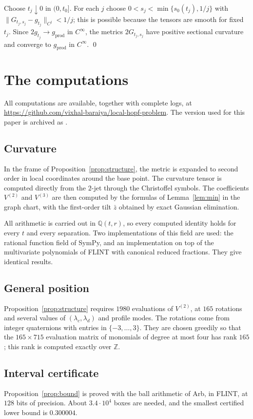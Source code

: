 \documentclass[11pt]{amsart}
\theoremstyle{definition}
\theoremstyle{remark}
\newcommand{\Q}{\mathbb{Q}}
\newcommand{\gprod}{g_{\mathrm{prod}}}
\newcommand{\codeurl}{\url{https://github.com/vixhal-baraiya/local-hopf-problem}}
\begin{document}
Choose $t_j\downarrow0$ in $(0,t_0]$. For each $j$ choose $0<s_j<\min\{s_0(t_j),1/j\}$ with $\|G_{t_j,s_j}-g_{t_j}\|_{C^j}<1/j$; this is possible because the tensors are smooth for fixed $t_j$. Since $2g_{t_j}\to\gprod$ in $C^\infty$, the metrics $2G_{t_j,s_j}$ have positive sectional curvature and converge to $\gprod$ in $C^\infty$. \qed

\section{The computations}\label{sec:computer}

All computations are available, together with complete logs, at\\ \codeurl. The version used for this paper is archived as \cite{code}.

\subsection*{Curvature}
In the frame of Proposition~\ref{prop:structure}, the metric is expanded to second order in local coordinates around the base point. The curvature tensor is computed directly from the $2$-jet through the Christoffel symbols. The coefficients $V^{(2)}$ and $V^{(3)}$ are then computed by the formulas of Lemma~\ref{lem:min} in the graph chart, with the first-order tilt $\bar z$ obtained by exact Gaussian elimination.

All arithmetic is carried out in $\Q(t,r)$, so every computed identity holds for every $t$ and every separation. Two implementations of this field are used: the rational function field of SymPy, and an implementation on top of the multivariate polynomials of FLINT with canonical reduced fractions. They give identical results.

\subsection*{General position}
Proposition~\ref{prop:structure} requires $1980$ evaluations of $V^{(2)}$, at $165$ rotations and several values of $(\lambda_c,\lambda_d)$ and profile modes. The rotations come from integer quaternions with entries in $\{-3,\dots,3\}$. They are chosen greedily so that the $165\times715$ evaluation matrix of monomials of degree at most four has rank $165$; this rank is computed exactly over $\mathbb Z$.

\subsection*{Interval certificate}
Proposition~\ref{prop:bound} is proved with the ball arithmetic of Arb, in FLINT, at $128$ bits of precision. About $3.4\cdot10^4$ boxes are needed, and the smallest certified lower bound is $0.300004$.
\end{document}
